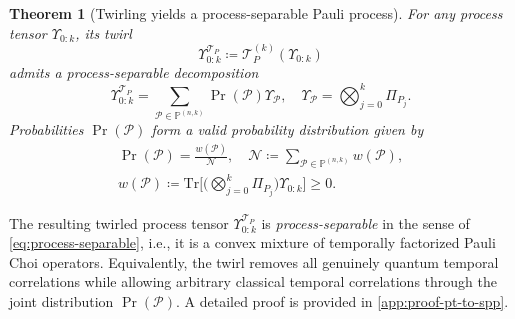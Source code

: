 \documentclass[
    aps,
    prx,
    reprint,
    superscriptaddress,
    longbibliography,
    nofootinbib,
    floatfix,
]{revtex4-2}
\newcommand{\Tr}{\mathrm{Tr}}
\newtheorem{theorem}{Theorem}
\begin{document}
\begin{theorem}[Twirling yields a process-separable Pauli process]\label{thm:pt-to-spp}
    For any process tensor \(\Upsilon_{0:k}\), its twirl
    \begin{equation}
        \Upsilon_{0:k}^{\mathcal{T}_P} \coloneq \mathcal{T}_P^{(k)}(\Upsilon_{0:k})
    \end{equation}
    admits a process-separable decomposition
    \begin{equation}
        \Upsilon_{0:k}^{\mathcal{T}_P} = \sum_{\mathcal{P}\in\mathbb{P}^{(n,k)}}\Pr{(\mathcal{P})}\Upsilon_\mathcal{P}, \quad \Upsilon_\mathcal{P} = \bigotimes_{j=0}^k\Pi_{P_j}.
    \end{equation}
    Probabilities \(\Pr{(\mathcal{P})}\) form a valid probability distribution given by
    \begin{equation}\label{eq:spp-probabilities}
        \begin{gathered}
            \Pr{(\mathcal{P})} = \frac{w(\mathcal{P})}{\mathcal{N}}, 
            \quad 
            \mathcal{N} \coloneq \sum_{\mathcal{P}\in\mathbb{P}^{(n,k)}} w(\mathcal{P}),
            \\
            w(\mathcal{P}) \coloneq \Tr\bigg[\bigg(\bigotimes_{j=0}^k\Pi_{P_j}\bigg)\Upsilon_{0:k}\bigg] \geq 0.
        \end{gathered}
    \end{equation}
\end{theorem}

The resulting twirled process tensor \(\Upsilon_{0:k}^{\mathcal{T}_P}\) is \emph{process-separable} in the sense of \cref{eq:process-separable}, i.e., it is a convex mixture of temporally factorized Pauli Choi operators. Equivalently, the twirl removes all genuinely quantum temporal correlations while allowing arbitrary classical temporal correlations through the joint distribution \(\Pr{(\mathcal{P})}\). A detailed proof is provided in \cref{app:proof-pt-to-spp}.
\end{document}
